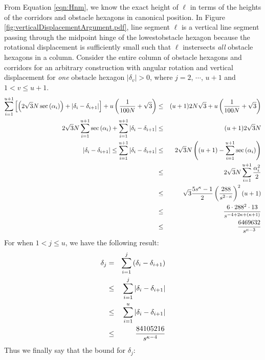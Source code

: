 From Equation \ref{eqn:Hnm}, we know the exact height of $\ell$ in terms of the heights of the corridors and obstacle hexagons in canonical position.
In Figure \ref{fig:verticalDisplacementArgument.pdf}, line segment $\ell$ is a vertical line segment passing through  the midpoint hinge of the lowestobstacle hexagon  because the rotational displacement is sufficiently small such that $\ell$ instersects \textit{all} obstacle hexagons in a column.  
Consider the entire column of obstacle hexagons and corridors for an arbitrary construction with angular rotation and vertical displacement for \textit{one} obstacle hexagon $\vert \delta_v \vert > 0$, where $j=2$, $\cdots$, $u+1$ and $1 < v \leq u+1$.
\begin{eqnarray*}
\sum_{i=1}^{u+1} \left[ \left( 2 \sqrt{3} N \sec \left(  \alpha_i \right) \right) + \left\vert \delta_i - \delta_{i+1} \right\vert \right] + u \left( \frac{1}{100N}+\sqrt{3} \right) &\leq& (u+1) 2 N \sqrt{3} + u  \left( \frac{1}{100N}+\sqrt{3} \right)\\
2 \sqrt{3} N \sum_{i=1}^{u+1} \sec \left(  \alpha_i \right) + \sum_{i=1}^{u+1} \left\vert \delta_i - \delta_{i+1} \right\vert &\leq& (u+1) 2 \sqrt{3} N \\
\left\vert \delta_i - \delta_{i+1} \right\vert\leq \sum_{i=1}^{u+1}\left\vert \delta_i - \delta_{i+1} \right\vert &\leq&  2 \sqrt{3} N \left( (u+1) - \sum_{i=1}^{u+1} \sec \left(  \alpha_i \right) \right)\\
&\leq& 2 \sqrt{3} N \sum_{i=1}^{u+1} \frac{\alpha_i^2}{2}\\
&\leq&  \sqrt{3} \frac{5s^\kappa - 1}{2} \left( \frac{288}{s^{2-\kappa}} \right)^2 (u+1)\\ 
&\leq& \frac{6 \cdot 288^2 \cdot 13}{s^{-4+2\kappa + \left( \kappa + 1 \right)}}\\
&\leq&\frac{6469632}{s^{\kappa-3}}
\end{eqnarray*}
For when $1< j\leq u$, we have the following result:
\begin{eqnarray*}
\delta_j &=& \sum_{i=1}^{j} \left( \delta_i - \delta_{i+1} \right)\\
&\leq&\sum_{i=1}^{j} \left\vert \delta_i - \delta_{i+1} \right\vert\\
&\leq& \sum_{i=1}^{u} \left\vert \delta_i - \delta_{i+1} \right\vert\\
&\leq&  \frac{84105216}{s^{\kappa-4}}
\end{eqnarray*}
Thus we finally say that the bound for $\delta_j$:

